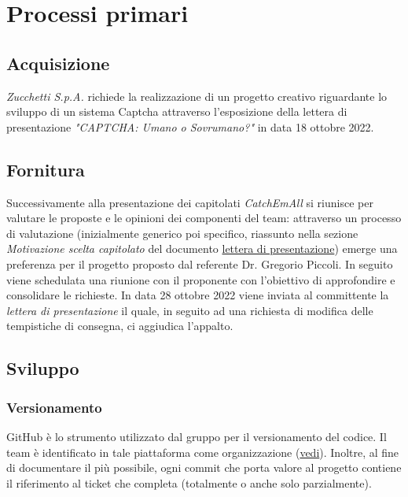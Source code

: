 \section{Processi primari}
\subsection{Acquisizione}
\textit{Zucchetti S.p.A.} richiede la realizzazione di un progetto creativo riguardante lo sviluppo di un sistema Captcha attraverso l'esposizione della lettera di presentazione \textit{"CAPTCHA: Umano o Sovrumano?"} in data 18 ottobre 2022.

\subsection{Fornitura}
Successivamente alla presentazione dei capitolati \textit{CatchEmAll} si riunisce per valutare le proposte e le opinioni dei componenti del team: attraverso un processo di valutazione (inizialmente generico poi specifico, riassunto nella sezione \textit{Motivazione scelta capitolato} del documento \href{https://github.com/catchEmAll-SWE/catchEmAll-Docs/blob/main/Assegnazione appalti/LetteraCandidatura.pdf}{lettera di presentazione}) emerge una preferenza per il progetto proposto dal referente Dr. Gregorio Piccoli.  
\newline
In seguito viene schedulata una riunione con il proponente con l'obiettivo di approfondire e consolidare le richieste. 
\newline
In data 28 ottobre 2022 viene inviata al committente la \textit{lettera di presentazione} il quale, in seguito ad una richiesta di modifica delle tempistiche di consegna, ci aggiudica l'appalto.

\subsection{Sviluppo}
    \subsubsection{Versionamento}
    GitHub è lo strumento utilizzato dal gruppo per il versionamento del codice.
    \newline Il team è identificato in tale piattaforma come organizzazione (\href{https://github.com/catchEmAll-SWE}{vedi}).
    Inoltre, al fine di documentare il più possibile, ogni commit che porta valore al progetto contiene il riferimento al ticket che completa (totalmente o anche solo parzialmente). 
    
